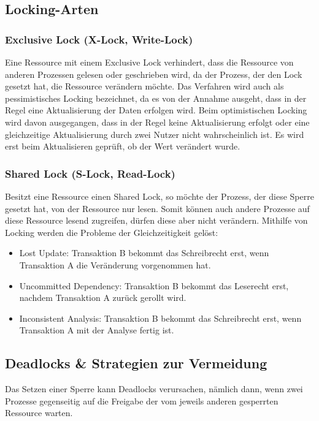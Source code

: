 \subsection{Locking-Arten}
\subsubsection*{Exclusive Lock (X-Lock, Write-Lock)}
Eine Ressource mit einem Exclusive Lock verhindert, dass die Ressource von anderen Prozessen gelesen oder geschrieben wird, da der Prozess, der den Lock gesetzt hat, die Ressource verändern möchte. Das Verfahren wird auch als pessimistisches Locking bezeichnet, da es von der Annahme ausgeht, dass in der Regel eine Aktualisierung der Daten erfolgen wird. Beim optimistischen Locking wird davon ausgegangen, dass in der Regel keine Aktualisierung erfolgt oder eine gleichzeitige Aktualisierung durch zwei Nutzer nicht wahrscheinlich ist. Es wird erst beim Aktualisieren geprüft, ob der Wert verändert wurde.

\subsubsection*{Shared Lock (S-Lock, Read-Lock)}
Besitzt eine Ressource einen Shared Lock, so möchte der Prozess, der diese Sperre gesetzt hat, von der Ressource nur lesen. Somit können auch andere Prozesse auf diese Ressource lesend zugreifen, dürfen diese aber nicht verändern.
\newline
\newline
Mithilfe von Locking werden die Probleme der Gleichzeitigkeit gelöst:
\begin{itemize}
    \item Lost Update: Transaktion B bekommt das Schreibrecht erst, wenn Transaktion A die Veränderung vorgenommen hat.
    \item Uncommitted Dependency: Transaktion B bekommt das Leserecht erst, nachdem Transaktion A zurück gerollt wird.
    \item Inconsistent Analysis: Transaktion B bekommt das Schreibrecht erst, wenn Transaktion A mit der Analyse fertig ist.
\end{itemize}

\subsection{Deadlocks \& Strategien zur Vermeidung}
Das Setzen einer Sperre kann Deadlocks verursachen, nämlich dann, wenn zwei Prozesse gegenseitig auf die Freigabe der vom jeweils anderen gesperrten Ressource warten.

